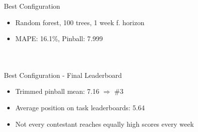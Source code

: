\documentclass{beamer}
\begin{document}
\begin{frame}{Best Configuration}
\begin{itemize}
\item Random forest, 100 trees, 1 week f. horizon 
\pause
\item MAPE: 16.1\%, Pinball: 7.999 
\end{itemize}
\begin{columns}[c] %
        \begin{figure}
		\centering
		\end{figure}
	    \begin{figure}
		\centering
		\hspace*{-1.8em}
		\end{figure}
\end{columns}

\end{frame}

\begin{frame}{Best Configuration - Final Leaderboard}
\begin{itemize}
\item Trimmed pinball mean: 7.16 $\Rightarrow$ \#3 %
\item Average position on task leaderboards: 5.64
\item Not every contestant reaches equally high scores every week
\end{itemize}

\begin{figure}
\centering
{}
\end{figure}
\end{frame}
\end{document}
